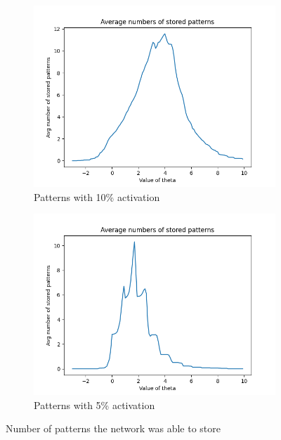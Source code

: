 \documentclass[a4paper]{article}
\begin{document}
\begin{figure}[ht]
    \centering
    \begin{subfigure}[b]{0.48\textwidth}
        \includegraphics[width=\textwidth]{Labs/Lab 3/images/stored_patterns_theta.png}
        \caption{Patterns with 10\% activation}
    \end{subfigure}
    \hfill
    \begin{subfigure}[b]{0.48\textwidth}
        \includegraphics[width=\textwidth]{Labs/Lab 3/images/stored_patterns_theta_005_activity.png}
        \caption{Patterns with 5\% activation}
    \end{subfigure}
    \caption{Number of patterns the network was able to store}
    \label{fig:stored-patterns-theta}
\end{figure}
\end{document}
